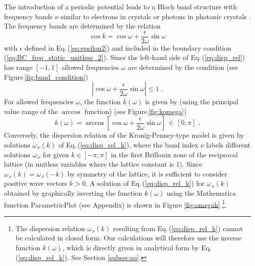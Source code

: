 The introduction of a periodic potential leads to a Bloch band structure 
with frequency bands $\nu$ similar to electrons in crystals
\cite{Ashcroft1976} or photons in photonic crystals \cite{Joannopoulos2008}.
The frequency bands are determined by the relation
%
\begin{equation}\label{eq:disp_rel}
    \cos{k} = \cos{\omega} + \frac{\epsilon}{2\omega}\sin{\omega}
\end{equation}
%
with $\epsilon$ defined in Eq.\,(\ref{eq:epsilon2}) and included in the boundary condition 
(\ref{eq:BC_freq_static_unitless_2}). 
Since the left-hand side of Eq.\,(\ref{eq:disp_rel}) has range $[-1,1]$ allowed frequencies 
$\omega$ are determined by the condition (see Figure\,\ref{fig:band_condition})
%
\begin{equation}\label{eq:bands_condition}
    \left|\cos{\omega} + \frac{\epsilon}{2\omega}\sin{\omega}\right| \leq 1 \, \, .
\end{equation}
%
For allowed frequencies $\omega$, the function $k(\omega)$ is given by
(using the principal value range of the $\arccos$ function) (see Figure\,\ref{fig:komega})
%
\begin{equation}\label{eq:disp_rel_k}
    k(\omega) = \arccos\left[ \cos{\omega} + \frac{\epsilon}{2\omega}\sin{\omega} \right] \, \in \, [0, \pi] \, \, .
\end{equation}
%
Conversely, the dispersion relation of the Kronig-Penney-type model is given by solutions 
$\omega_{\, \nu}(k)$ of Eq.\,(\ref{eq:disp_rel_k}), where the 
band index $\nu$ labels different solutions $\omega_{\, \nu}$ for given $k \in [-\pi, \pi]$
in the first Brillouin zone of the reciprocal lattice (in unitless variables where the lattice
constant is 1).
Since $\omega_{\, \nu}(k) = \omega_{\, \nu}(-k)$ by symmetry of the lattice, 
it is sufficient to consider positive wave vectors $k>0$. 
A solution 
of Eq.\,(\ref{eq:disp_rel_k}) for $\omega_{\, \nu}(k)$ obtained 
by graphically inverting the function $k(\omega)$ using the 
Mathematica function ParametricPlot (see Appendix) 
is shown in Figure \ref{fig:omegak}
%
\footnote{The dispersion relation $\omega_{\, \nu}(k)$ resulting from Eq.\,(\ref{eq:disp_rel_k}) cannot be 
calculated in closed form. Our calculations will therefore use the inverse function $k(\omega)$,
which is directly given in analytical form by Eq.\,(\ref{eq:disp_rel_k}). See Section \ref{subsec:sq}.}.

